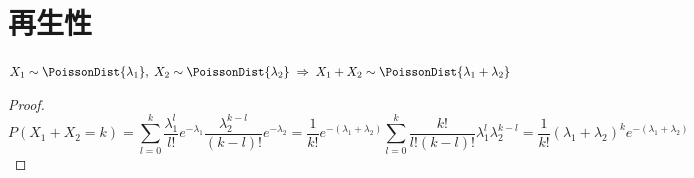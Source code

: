    \section{再生性}
        \begin{shadebox}
            $X_1 \sim \PoissonDist{\lambda_1},\;X_2 \sim \PoissonDist{\lambda_2}\;\Rightarrow\;X_1+X_2 \sim \PoissonDist{\lambda_1 + \lambda_2}$
        \end{shadebox}
        \begin{proof}
            \[ P(X_1+X_2 = k) = \sum_{l=0}^k \frac{\lambda_1^l}{l!}e^{-\lambda_1}\frac{\lambda_2^{k-l}}{(k-l)!}e^{-\lambda_2} = \frac{1}{k!}e^{-(\lambda_1+\lambda_2)} \sum_{l=0}^k \frac{k!}{l!(k-l)!}\lambda_1^l\lambda_2^{k-l} = \frac{1}{k!}(\lambda_1+\lambda_2)^k e^{-(\lambda_1+\lambda_2)} \]
        \end{proof}